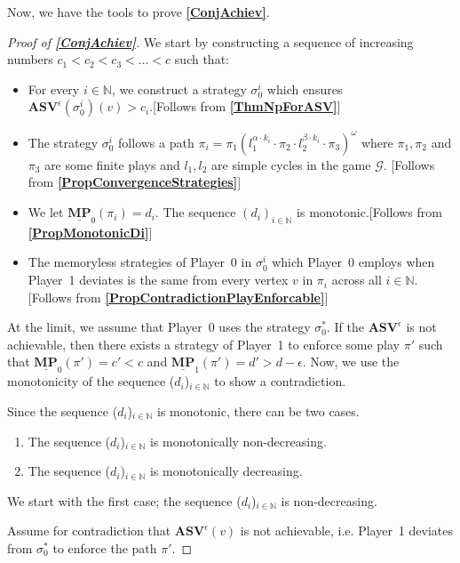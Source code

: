 Now, we have the tools to prove \textbf{\cref{ConjAchiev}}.
\begin{proof}[Proof of \textbf{\cref{ConjAchiev}}]
We start by constructing a sequence of increasing numbers $c_1 < c_2 < c_3 < \dotsc < c$ such that:
\begin{itemize}
    \item For every $i \in \mathbb{N}$, we construct a strategy $\sigma_0^i$ which ensures $\mathbf{ASV}^{\epsilon}(\sigma_0^i)(v) > c_i$.[Follows from \textbf{\cref{ThmNpForASV}}]
    \item The strategy $\sigma_0^i$ follows a path $\pi_i = \pi_{1}(l^{\alpha \cdot k_i}_{1} \cdot \pi_{2} \cdot l^{\beta \cdot k_i}_{2} \cdot \pi_{3})^{\omega}$ where $\pi_1, \pi_2$ and $\pi_3$ are some finite plays and $l_1, l_2$ are simple cycles in the game $\mathcal{G}$. [Follows from \textbf{\cref{PropConvergenceStrategies}}]
    \item We let $\underline{\mathbf{MP}}_0(\pi_i) = d_i$. The sequence $(d_i)_{i\in \mathbb{N}}$ is monotonic.[Follows from \textbf{\cref{PropMonotonicDi}}]
    \item The memoryless strategies of Player~0 in $\sigma_0^i$ which Player~0 employs when Player~1 deviates is the same from every vertex $v$ in $\pi_i$ across all $i \in \mathbb{N}$.[Follows from \textbf{\cref{PropContradictionPlayEnforcable}}]
\end{itemize}

At the limit, we assume that Player~0 uses the strategy $\sigma_0^*$. If the $\mathbf{ASV}^{\epsilon}$ is not achievable, then there exists a strategy of Player~1 to enforce some play $\pi'$ such that $\underline{\mathbf{MP}}_0(\pi') = c' < c$ and $\underline{\mathbf{MP}}_1(\pi') = d' > d - \epsilon$. Now, we use the monotonicity of the sequence ($d_i$)$_{i \in \mathbb{N}}$ to show a contradiction. 

Since the sequence ($d_i$)$_{i \in \mathbb{N}}$ is monotonic, there can be two cases.
\begin{enumerate}
    \item The sequence ($d_i$)$_{i \in \mathbb{N}}$ is monotonically non-decreasing.
    \item The sequence ($d_i$)$_{i \in \mathbb{N}}$ is monotonically decreasing.
\end{enumerate}

We start with the first case; the sequence ($d_i$)$_{i \in \mathbb{N}}$ is non-decreasing.

Assume for contradiction that $\mathbf{ASV}^{\epsilon}(v)$ is not achievable, i.e. Player~1 deviates from $\sigma_0^*$ to enforce the path $\pi'$. 


\end{proof}
